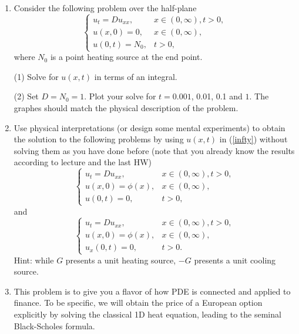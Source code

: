 \documentclass[6pt]{article}
\numberwithin{equation}{section}
\begin{document}
\begin{enumerate}
\item Consider the following problem over the half-plane
\begin{equation}
\left\{
\begin{array}{ll}
u_t=D u_{xx},& x\in (0,\infty), t>0,\\
u(x,0)=0,&x \in (0,\infty),\\
u(0,t)=N_0,&t>0,
\end{array}
\right.
\end{equation}
where $N_0$ is a point heating source at the end point.

(1) Solve for $u(x,t)$ in terms of an integral.


(2) Set $D=N_0=1$.  Plot your solve for $t=0.001$, 0.01, 0.1 and $1$.  The graphes should match the physical description of the problem.

\item
Use physical interpretations (or design some mental experiments) to obtain the solution to the following problems by using $u(x,t)$ in (\ref{infty}) without solving them as you have done before (note that you already know the results according to lecture and the last HW)
\begin{equation}\label{DBC}
\left\{
\begin{array}{ll}
u_t=D u_{xx},& x\in (0,\infty), t>0,\\
u(x,0)=\phi(x),&x \in (0,\infty),\\
u(0,t)=0,&t>0,
\end{array}
\right.
\end{equation}
and
\begin{equation}\label{NBC}
\left\{
\begin{array}{ll}
u_t=D u_{xx},& x\in (0,\infty), t>0,\\
u(x,0)=\phi(x),&x \in (0,\infty),\\
u_x(0,t)=0,&t>0.
\end{array}
\right.
\end{equation}
Hint: while $G$ presents a unit heating source, $-G$ presents a unit cooling source.

\item  This problem is to give you a flavor of how PDE is connected and applied to finance.  To be specific, we will obtain the price of a European option explicitly by solving the classical 1D heat equation, leading to the seminal Black-Scholes formula.


\end{enumerate}
\end{document}
